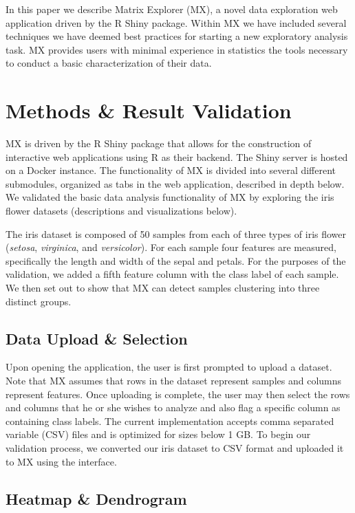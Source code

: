 \documentclass{article}
\begin{document}
In this paper we describe Matrix Explorer (MX), a novel data exploration web application driven by the R Shiny package. Within MX we have included several techniques we have deemed best practices for starting a new exploratory analysis task. MX provides users with minimal experience in statistics the tools necessary to conduct a basic characterization of their data.

\section{Methods \& Result Validation}
\label{sec:meth}

MX is driven by the R Shiny package that allows for the construction of interactive web applications using R as their backend. The Shiny server is hosted on a Docker instance. The functionality of MX is divided into several different submodules, organized as tabs in the web application, described in depth below. We validated the basic data analysis functionality of MX by exploring the iris flower datasets (descriptions and visualizations below). 

The iris dataset is composed of 50 samples from each of three types of iris flower (\textit{setosa}, \textit{virginica}, and \textit{versicolor}). For each sample four features are measured, specifically the length and width of the sepal and petals. For the purposes of the validation, we added a fifth feature column with the class label of each sample. We then set out to show that MX can detect samples clustering into three distinct groups.

\subsection{Data Upload \& Selection}
\label{subsec:SubSecUpload}

Upon opening the application, the user is first prompted to upload a dataset. Note that MX assumes that rows in the dataset represent samples and columns represent features. Once uploading is complete, the user may then select the rows and columns that he or she wishes to analyze and also flag a specific column as containing class labels. The current implementation accepts comma separated variable (CSV) files and is optimized for sizes below 1 GB. To begin our validation process, we converted our iris dataset to CSV format and uploaded it to MX using the interface.

\subsection{Heatmap \& Dendrogram}
\label{subsec:SubSecHeatmap}
\end{document}
